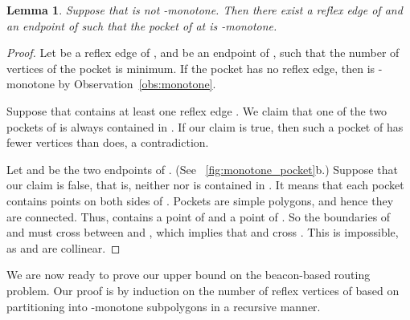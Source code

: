\documentclass[11pt]{article}
\newtheorem{lemma}{Lemma}
\theoremstyle{definition}
\begin{document}
\begin{lemma} \label{lem:monotone_pocket}
 Suppose that  is not -monotone.
 Then there exist a reflex edge  of  and an endpoint  of  such that
 the pocket  of  at  is -monotone. 
\end{lemma}
\begin{proof} 
Let  be a reflex edge of , and  be an endpoint of , such that
the number of vertices of the pocket  is minimum.
If the pocket  has no reflex edge, then
 is -monotone by Observation~\ref{obs:monotone}.

Suppose that  contains at least one reflex edge .
We claim that one of the two pockets of  is always contained in .
If our claim is true, then such a pocket of  has fewer vertices
than  does, a contradiction.

Let  and  be the two endpoints of . (See \figurename~\ref{fig:monotone_pocket}b.)
Suppose that our claim is false,
that is, neither  nor   is contained in .
It means that each pocket contains points on both sides of  .
Pockets are simple polygons, and hence they are connected. Thus,  contains
a point  of  and a point  of . So the boundaries
of   and  must cross  between  and ,
which implies that  and  cross . This
is impossible, as   and  are
collinear.
\end{proof}

We are now ready to prove our upper bound 
on the beacon-based routing problem.
Our proof is by induction on the number  of reflex vertices of 
based on partitioning  into -monotone subpolygons in a recursive manner. 
\end{document}
